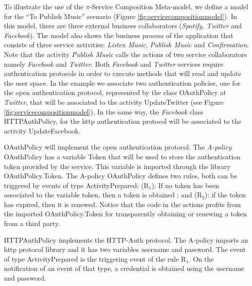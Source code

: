 \begin{example}\label{ex:toPublicMusic}
To illustrate the use of the $\pi$-Service Composition Meta-model, we define a model for the ``To Publish Music'' scenario (Figure \ref{fig:servicecompositionmodel}). 
In this model, there are three external business collaborators ({\em Spotify, Twitter} and {\em Facebook}).
The model also shows the business process of the application that consists of three service activities: {\em Listen Music}, {\em Publish Music} and {\em Confirmation}. 
Note that  the activity {\em Publish Music} calls the actions of two service collaborators namely {\em Facebook} and {\em Twitter}.
Both {\em Facebook} and {\em Twitter} services require authentication protocols in order to execute methods that will read and update the user space. 
In the example we  associate two authentication policies, one for the open authentication protocol, represented by the class {\sf\small OAuthPolicy} at {\em Twitter}, that will be associated to the activity  {\sf\small UpdateTwitter} (see Figure \ref{fig:servicecompositionmodel}). 
In the same way, the {\em Facebook} class {\sf\small HTTPAuthPolicy}, for the http authentication protocol will be associated to the activity {\sf\small UpdateFacebook}.

{\sf\small OAuthPolicy} will implement the open authentication protocol.
The {\em A-policy} {\sf\small OAuthPolicy} has a variable {\sf\small Token} that will be used to store the authentication token provided by the service.
This variable is imported through the library {\sf\small OAuthPolicy.Token}. 
The A-policy {\sf\small OAuthPolicy} defines two rules, both can be triggered by events of type {\sf\small ActivityPrepared}: (R$_1$): If no token has been associated to the variable {\sf\small token}, then a token is obtained ; and (R$_2$): if the token has expired, then it is renewed. 
Notice that the code in the actions profits from the imported {\sf\small OAuthPolicy.Token} for transparently obtaining or renewing a token from a third party.

{\sf\small HTTPAuthPolicy} implements the HTTP-Auth protocol. 
The A-policy imports an http protocol library and it has two variables {\sf\small username} and {\sf\small password}.  
The event of type {\sf\small ActivityPrepared} is the triggering event of the rule {\sf\small R$_1$}. 
On the notification of an event of that type, a credential is obtained using the username and password. 
\hfill\openbox
\end{example}

